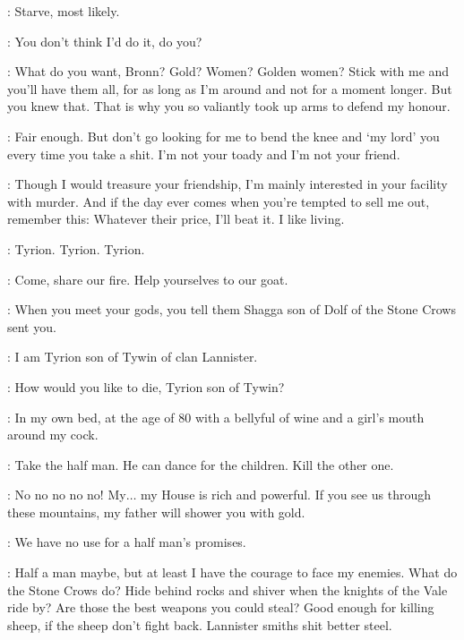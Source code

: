 \TYRION: Starve, most likely. 

\BRONN: You don't think I'd do it, do you? 

\TYRION: What do you want, Bronn? Gold? Women? Golden women? Stick with me and you'll have them all, for as long as I'm around and not for a moment longer. But you knew that. That is why you so valiantly took up arms to defend my honour. 

\BRONN: Fair enough.  But don't go looking for me to bend the knee and `my lord' you every time you take a shit. I'm not your toady and I'm not your friend. 

\TYRION: Though I would treasure your friendship, I'm mainly interested in your facility with murder. And if the day ever comes when you're tempted to sell me out, remember this: Whatever their price, I'll beat it. I like living. 


\BRONN: Tyrion. Tyrion. Tyrion. 


\TYRION: Come, share our fire. Help yourselves to our goat. 

\SHAGGA: When you meet your gods, you tell them Shagga son of Dolf of the Stone Crows sent you. 

\TYRION: I am Tyrion son of Tywin of clan Lannister. 

\SHAGGA: How would you like to die, Tyrion son of Tywin? 

\TYRION: In my own bed, at the age of 80 with a bellyful of wine and a girl's mouth around my cock. 

\SHAGGA:  Take the half man. He can dance for the children. Kill the other one. 


\TYRION: No no no no no! My$\ldots$ my House is rich and powerful. If you see us through these mountains, my father will shower you with gold. 

\SHAGGA: We have no use for a half man's promises.

\TYRION: Half a man maybe, but at least I have the courage to face my enemies. What do the Stone Crows do? Hide behind rocks and shiver when the knights of the Vale ride by? Are those the best weapons you could steal? Good enough for killing sheep, if the sheep don't fight back. Lannister smiths shit better steel. 


